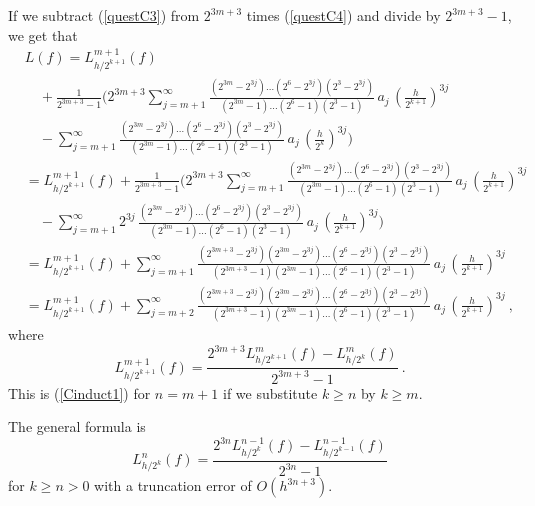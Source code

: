 {If we subtract (\ref{questC3}) from $\displaystyle 2^{3m+3}$ times
(\ref{questC4}) and divide by $\displaystyle 2^{3m+3}-1$, we get that
\begin{align*}
&L(f) = L_{h/2^{k+1}}^{m+1}(f) \\
&\quad + \frac{1}{2^{3m+3}-1}
\bigg( 2^{3m+3} \sum_{j=m+1}^\infty
\frac{(2^{3m}-2^{3j}) \ldots (2^6-2^{3j})(2^3-2^{3j})}
{(2^{3m}-1)\ldots(2^6-1)(2^3-1)}\, a_j\, \left(\frac{h}{2^{k+1}}\right)^{3j} \\
&\quad -\sum_{j=m+1}^\infty
\frac{(2^{3m}-2^{3j}) \ldots (2^6-2^{3j})(2^3-2^{3j})}
{(2^{3m}-1)\ldots(2^6-1)(2^3-1)}\, a_j\, \left(\frac{h}{2^k}\right)^{3j}
\bigg) \\
&= L_{h/2^{k+1}}^{m+1}(f) + \frac{1}{2^{3m+3}-1}
\bigg( 2^{3m+3} \sum_{j=m+1}^\infty
\frac{(2^{3m}-2^{3j}) \ldots (2^6-2^{3j})(2^3-2^{3j})}
{(2^{3m}-1)\ldots(2^6-1)(2^3-1)}\, a_j\, \left(\frac{h}{2^{k+1}}\right)^{3j} \\
& \quad -\sum_{j=m+1}^\infty
2^{3j} \,\frac{(2^{3m}-2^{3j}) \ldots (2^6-2^{3j})(2^3-2^{3j})}
{(2^{3m}-1)\ldots(2^6-1)(2^3-1)}\, a_j\, \left(\frac{h}{2^{k+1}}\right)^{3j}
\bigg) \\
&= L_{h/2^{k+1}}^{m+1}(f) + \sum_{j=m+1}^\infty
\frac{(2^{3m+3} - 2^{3j})(2^{3m}-2^{3j}) \ldots (2^6-2^{3j})(2^3-2^{3j})}
{(2^{3m+3}-1)(2^{3m}-1)\ldots(2^6-1)(2^3-1)}\,
a_j\, \left(\frac{h}{2^{k+1}}\right)^{3j} \\
&= L_{h/2^{k+1}}^{m+1}(f) + \sum_{j=m+2}^\infty
\frac{(2^{3m+3} - 2^{3j})(2^{3m}-2^{3j}) \ldots (2^6-2^{3j})(2^3-2^{3j})}
{(2^{3m+3}-1)(2^{3m}-1)\ldots(2^6-1)(2^3-1)}\,
 a_j\, \left(\frac{h}{2^{k+1}}\right)^{3j} \ ,
\end{align*}
where
\[
L_{h/2^{k+1}}^{m+1}(f) = \frac{2^{3m+3}L_{h/2^{k+1}}^m(f)-L_{h/2^k}^m(f)}
{2^{3m+3}-1} \ .
\]
This is (\ref{Cinduct1}) for $n=m+1$ if we substitute
$k \geq n$ by $k\geq m$.

The general formula is
\[
L_{h/2^k}^n(f) = \frac{2^{3n} L_{h/2^k}^{n-1}(f) -
  L_{h/2^{k-1}}^{n-1}(f)}{2^{3n} -1}
\]
for $k \geq n > 0$ with a truncation error of $\displaystyle O(h^{3n+3})$.
}

